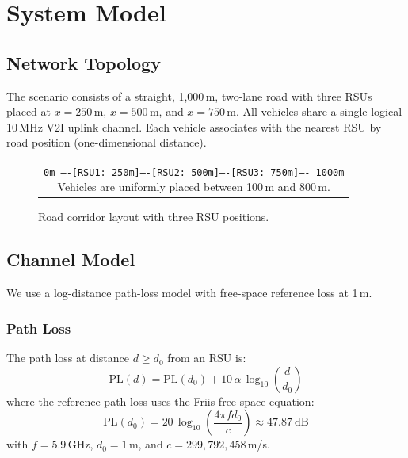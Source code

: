 \documentclass[12pt, a4paper]{article}
\begin{document}
\section{System Model}

\subsection{Network Topology}

The scenario consists of a straight, 1{,}000\,m, two-lane road with three RSUs
placed at $x = 250$\,m, $x = 500$\,m, and $x = 750$\,m.  All vehicles share a
single logical 10\,MHz V2I uplink channel.  Each vehicle associates with the
nearest RSU by road position (one-dimensional distance).

\begin{figure}[H]
    \centering
    \begin{tabular}{c}
    \fbox{\parbox{0.85\textwidth}{\centering
    \texttt{0m ----[RSU1: 250m]----[RSU2: 500m]----[RSU3: 750m]---- 1000m}\\[3pt]
    \small Vehicles are uniformly placed between 100\,m and 800\,m.
    }}
    \end{tabular}
    \caption{Road corridor layout with three RSU positions.}
    \label{fig:topology}
\end{figure}

\subsection{Channel Model}

We use a log-distance path-loss model with free-space reference loss at 1\,m.

\subsubsection{Path Loss}

The path loss at distance $d \geq d_0$ from an RSU is:
\begin{equation}
    \mathrm{PL}(d) = \mathrm{PL}(d_0) + 10\,\alpha\,\log_{10}\!\left(\frac{d}{d_0}\right)
    \label{eq:pathloss}
\end{equation}
where the reference path loss uses the Friis free-space equation:
\begin{equation}
    \mathrm{PL}(d_0) = 20\,\log_{10}\!\left(\frac{4\pi f d_0}{c}\right) \approx 47.87~\text{dB}
    \label{eq:friis}
\end{equation}
with $f = 5.9$\,GHz, $d_0 = 1$\,m, and $c = 299{,}792{,}458$\,m/s.
\end{document}
